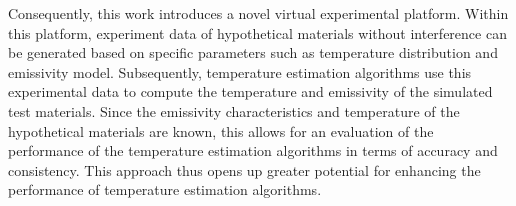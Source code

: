 Consequently, this work introduces a novel virtual experimental platform. 
Within this platform, experiment data of hypothetical materials without 
interference can be generated based on specific parameters such as 
temperature distribution and emissivity model. Subsequently, temperature 
estimation algorithms use this experimental data to compute the 
temperature and emissivity of the simulated test materials. 
Since the emissivity characteristics and temperature of the hypothetical 
materials are known, this allows for an evaluation of the performance 
of the temperature estimation algorithms in terms of accuracy and 
consistency. This approach thus opens up greater potential for 
enhancing the performance of temperature estimation algorithms.




